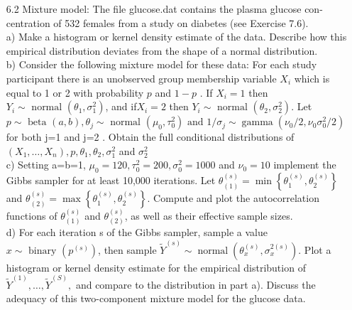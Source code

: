 \documentclass[a4paper]{article}
\begin{document}
\begin{enumerate}
 
 \item[6.2] 
Mixture model: The file glucose.dat contains the plasma glucose con- centration of 532 females from a study on diabetes (see Exercise 7.6).\\
a) Make a histogram or kernel density estimate of the data. Describe how this empirical distribution deviates from the shape of a normal distribution.\\
b) Consider the following mixture model for these data: For each study  participant there is an unobserved group membership variable $ X_{i}$   which is equal to  1  or  2 with probability $ p$ and $ 1-p$ . If $ X_{i}=1 $ then $ Y_{i} \sim \text { normal }\left(\theta_{1}, \sigma_{1}^{2}\right)$, and if$ X_{i}=2$  then $ Y_{i} \sim \text { normal }\left(\theta_{2}, \sigma_{2}^{2}\right) $. Let $  p \sim \text { beta }(a, b), \theta_{j} \sim \text { normal }\left(\mu_{0}, \tau_{0}^{2}\right) \text { and } 1 / \sigma_{j} \sim \operatorname{gamma}\left(\nu_{0} / 2, \nu_{0} \sigma_{0}^{2} / 2\right) $ for both  j=1 and  j=2 . Obtain the full conditional distributions of$ \left(X_{1}, \ldots, X_{n}\right), p, \theta_{1}, \theta_{2}, \sigma_{1}^{2} $ and $ \sigma_{2}^{2}$\\
c) Setting  a=b=1, $\mu_{0}=120, \tau_{0}^{2}=200, \sigma_{0}^{2}=1000 $ and $ \nu_{0}=10 $  implement the Gibbs sampler for at least  10,000  iterations. Let $ \theta_{(1)}^{(s)}=\min \left\{\theta_{1}^{(s)}, \theta_{2}^{(s)}\right\}$  and $ \theta_{(2)}^{(s)}=\max \left\{\theta_{1}^{(s)}, \theta_{2}^{(s)}\right\} $.  Compute and plot the autocorrelation functions of $ \theta_{(1)}^{(s)} $ and $ \theta_{(2)}^{(s)}$,  as well as their effective  sample sizes. \\
d) For each iteration  s of the Gibbs sampler, sample a value $ x \sim  \text { binary }\left(p^{(s)}\right)$,  then sample  $\tilde{Y}^{(s)} \sim \operatorname{normal}\left(\theta_{x}^{(s)}, \sigma_{x}^{2(s)}\right) $. Plot a histogram or kernel density estimate for the empirical distribution of $ \tilde{Y}^{(1)}, \ldots, \tilde{Y}^{(S)},$ and compare to the distribution in part a). Discuss  the adequacy of this two-component mixture model for the glucose data.


\end{enumerate}
\end{document}

